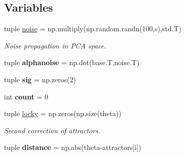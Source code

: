 \subsection*{Variables}
\begin{DoxyCompactItemize}
\item 
\hypertarget{namespace_mu_s_c_a_de_t_1_1pca__ring__spectrum_ac360a2667ea40480101c9857bb72b415}{}tuple \hyperlink{namespace_mu_s_c_a_de_t_1_1pca__ring__spectrum_ac360a2667ea40480101c9857bb72b415}{noise} = np.\+multiply(np.\+random.\+randn(100,s),std.\+T)\label{namespace_mu_s_c_a_de_t_1_1pca__ring__spectrum_ac360a2667ea40480101c9857bb72b415}

\begin{DoxyCompactList}\small\item\em Noise propagation in P\+C\+A space. \end{DoxyCompactList}\item 
\hypertarget{namespace_mu_s_c_a_de_t_1_1pca__ring__spectrum_aaf96720f93a4f3ddb2402749d8fa2023}{}tuple {\bfseries alphanoise} = np.\+dot(base.\+T,noise.\+T)\label{namespace_mu_s_c_a_de_t_1_1pca__ring__spectrum_aaf96720f93a4f3ddb2402749d8fa2023}

\item 
\hypertarget{namespace_mu_s_c_a_de_t_1_1pca__ring__spectrum_a9346e2ab02632318518839f60184f8db}{}tuple {\bfseries sig} = np.\+zeros(2)\label{namespace_mu_s_c_a_de_t_1_1pca__ring__spectrum_a9346e2ab02632318518839f60184f8db}

\item 
\hypertarget{namespace_mu_s_c_a_de_t_1_1pca__ring__spectrum_af500464fe43385ef4cedf34b7714be1b}{}int {\bfseries count} = 0\label{namespace_mu_s_c_a_de_t_1_1pca__ring__spectrum_af500464fe43385ef4cedf34b7714be1b}

\item 
\hypertarget{namespace_mu_s_c_a_de_t_1_1pca__ring__spectrum_afd5b4a3cc7842e3abd16d85932cd43aa}{}tuple \hyperlink{namespace_mu_s_c_a_de_t_1_1pca__ring__spectrum_afd5b4a3cc7842e3abd16d85932cd43aa}{locky} = np.\+zeros(np.\+size(theta))\label{namespace_mu_s_c_a_de_t_1_1pca__ring__spectrum_afd5b4a3cc7842e3abd16d85932cd43aa}

\begin{DoxyCompactList}\small\item\em Second correction of attractors. \end{DoxyCompactList}\item 
\hypertarget{namespace_mu_s_c_a_de_t_1_1pca__ring__spectrum_a9ceaaf4a07f09f1b369745016bdec3e7}{}tuple {\bfseries distance} = np.\+abs(theta-\/attractors\mbox{[}i\mbox{]})\label{namespace_mu_s_c_a_de_t_1_1pca__ring__spectrum_a9ceaaf4a07f09f1b369745016bdec3e7}


\end{DoxyCompactItemize}
